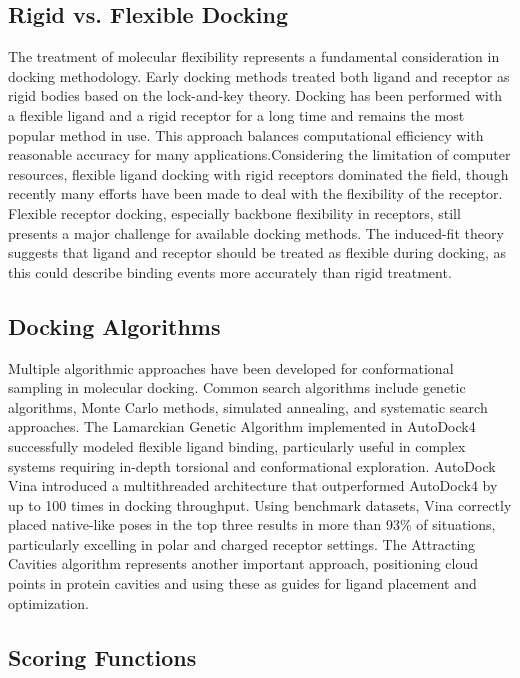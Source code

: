 \documentclass[12pt, a4paper]{article}
\begin{document}
\subsection{Rigid vs. Flexible Docking}
The treatment of molecular flexibility represents a fundamental consideration in docking methodology. Early docking methods treated both ligand and receptor as rigid bodies based on the lock-and-key theory. Docking has been performed with a flexible ligand and a rigid receptor for a long time and remains the most popular method in use. This approach balances computational efficiency with reasonable accuracy for many applications.Considering the limitation of computer resources, flexible ligand docking with rigid receptors dominated the field, though recently many efforts have been made to deal with the flexibility of the receptor. Flexible receptor docking, especially backbone flexibility in receptors, still presents a major challenge for available docking methods. The induced-fit theory suggests that ligand and receptor should be treated as flexible during docking, as this could describe binding events more accurately than rigid treatment\cite{CH1_18}.

\subsection{Docking Algorithms}
Multiple algorithmic approaches have been developed for conformational sampling in molecular docking. Common search algorithms include genetic algorithms, Monte Carlo methods, simulated annealing, and systematic search approaches. The Lamarckian Genetic Algorithm implemented in AutoDock4\cite{CH1_9} successfully modeled flexible ligand binding, particularly useful in complex systems requiring in-depth torsional and conformational exploration. AutoDock Vina\cite{CH1_19} introduced a multithreaded architecture that outperformed AutoDock4 by up to 100 times in docking throughput. Using benchmark datasets, Vina correctly placed native-like poses in the top three results in more than 93\% of situations, particularly excelling in polar and charged receptor settings. The Attracting Cavities algorithm represents another important approach, positioning cloud points in protein cavities and using these as guides for ligand placement and optimization.


\subsection{Scoring Functions}
\end{document}
